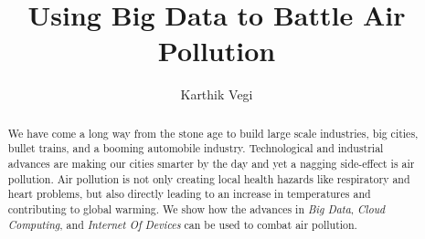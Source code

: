 \documentclass[sigconf]{acmart}
\begin{document}
\title{Using Big Data to Battle Air Pollution}

\author{Karthik Vegi}


\renewcommand{\shortauthors}{kvegi}

\begin{abstract}
We have come a long way from the stone age to build large scale industries, big cities, bullet trains, and a booming automobile industry. Technological and industrial advances are making our cities smarter by the day and yet a nagging side-effect is air pollution. Air pollution is not only creating local health hazards like respiratory and heart problems, but also directly leading to an increase in temperatures and contributing to global warming. We show how the advances in {\em Big Data}, {\em Cloud Computing}, and {\em Internet Of Devices} can be used to combat air pollution.
\end{abstract}


\maketitle
\end{document}
